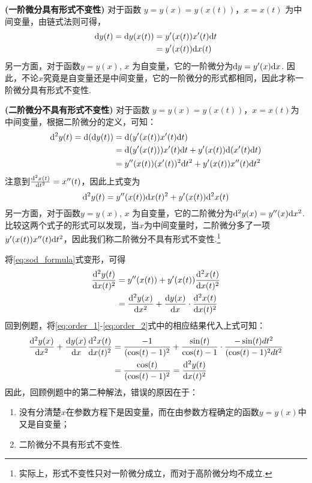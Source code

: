 	\textbf{(一阶微分具有形式不变性)} 对于函数 $y = y(x) = y(x(t))$，$x=x(t)$ 为中间变量，由链式法则可得，
	\begin{equation*}
	\begin{aligned}
		\mathrm{d} y(t) =  \mathrm{d} y(x(t)) &= y'(x(t))x'(t)\mathrm{d} t \\
			&= y'(x(t))\mathrm{d} x(t)
	\end{aligned}
	\end{equation*}
	另一方面，对于函数$y = y(x)$, $x$ 为自变量，它的一阶微分为$\mathrm{d} y = y'(x) \mathrm{d} x$. 因此，不论$x$究竟是自变量还是中间变量，它的一阶微分的形式都相同，因此才称一阶微分具有形式不变性.\par
	\textbf{(二阶微分不具有形式不变性)} 对于函数 $y = y(x) = y(x(t))$，$x = x(t)$为中间变量，根据二阶微分的定义，可知：
	\begin{equation*}
	\begin{aligned}
		\mathrm{d}^2 y(t) =  \mathrm{d} (\mathrm{d} y(t)) &= \mathrm{d}(y'(x(t))x'(t)\mathrm{d} t) \\
		&= \mathrm{d}(y'(x(t)))x'(t)\mathrm{d} t + y'(x(t))\mathrm{d}(x'(t)\mathrm{d} t)\\
		&= y''(x(t))(x'(t))^2\mathrm{d} t^2 + y'(x(t))x''(t)\mathrm{d} t^2 \\
	\end{aligned}
	\end{equation*}
	注意到$\frac{\mathrm{d}^2 x(t)}{\mathrm{d} t^2} = x''(t)$，因此上式变为
	\begin{equation}
	\label{eq:sod_formula}
	\mathrm{d}^2 y(t)=y''(x(t))\mathrm{d} x(t)^2 + y'(x(t))\mathrm{d}^2x(t)
	\end{equation}
	另一方面，对于函数$y = y(x)$, $x$ 为自变量，它的二阶微分为$\mathrm{d}^2 y(x) = y''(x)\mathrm{d} x^2$. 比较这两个式子的形式可以发现，当$x$为中间变量时，二阶微分多了一项$y'(x(t))x''(t)\mathrm{d} t^2$，因此我们称二阶微分不具有形式不变性.\footnote{实际上，形式不变性只对一阶微分成立，而对于高阶微分均不成立.}\par

	将\eqref{eq:sod_formula}式变形，可得
	$$\begin{aligned}
	\frac{\mathrm{d}^2 y(t)}{\mathrm{d} x(t)^2} &=y''(x(t)) + y'(x(t))\frac{\mathrm{d}^2x(t)}{\mathrm{d} x(t)^2}\\
	&= \frac{\mathrm{d}^2 y(x)}{\mathrm{d} x^2}+\frac{\mathrm{d} y(x)}{\mathrm{d} x}\cdot\frac{\mathrm{d}^2x(t)}{\mathrm{d} x(t)^2}\end{aligned}$$
	回到例题，将\eqref{eq:order_1}-\eqref{eq:order_2}式中的相应结果代入上式可知：
		$$\begin{aligned}
		\frac{\mathrm{d}^2 y(x)}{\mathrm{d} x^2}+\frac{\mathrm{d} y(x)}{\mathrm{d} x}\frac{\mathrm{d}^2x(t)}{\mathrm{d} x(t)^2} &= \frac{-1}{(\cos(t)-1)^2} + \frac{\sin(t)}{\cos(t)-1}\cdot\frac{-\sin(t) dt^2}{(\cos(t) - 1)^2 dt^2}\\
		&= \frac{\cos(t)}{(\cos(t)-1)^2} = \frac{\mathrm{d}^2 y(t)}{\mathrm{d} x(t)^2}
		\end{aligned}$$
	因此，回顾例题中的第二种解法，错误的原因在于：
	\begin{enumerate}
		\item 没有分清楚$x$在参数方程下是因变量，而在由参数方程确定的函数$y=y(x)$中又是自变量；
		\item 二阶微分不具有形式不变性.
	\end{enumerate}

